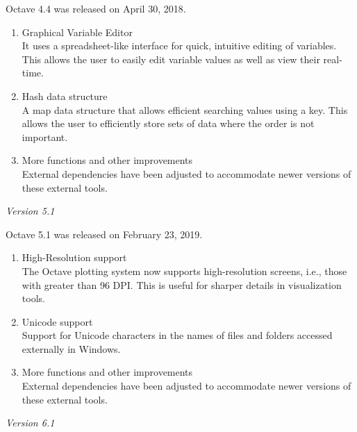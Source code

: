 \documentclass{article}
\begin{document}
\par
Octave 4.4 was released on April 30, 2018.
\begin{enumerate}

    \item Graphical Variable Editor\\
    It uses a spreadsheet-like interface for quick, intuitive editing of variables. This allows the user to easily edit variable values as well as view their real-time.

    \item Hash data structure\\
    A map data structure that allows efficient searching values using a key. This allows the user to efficiently store sets of data where the order is not important.

    \item More functions and other improvements\\
    External dependencies have been adjusted to accommodate newer versions of these external tools.

\end{enumerate}

\par
\noindent
\textit{Version 5.1}

\par
Octave 5.1 was released on February 23, 2019.
\begin{enumerate}

    \item High-Resolution support\\
    The Octave plotting system now supports high-resolution screens, i.e., those with greater than 96 DPI. This is useful for sharper details in visualization tools.

    \item Unicode support\\
    Support for Unicode characters in the names of files and folders accessed externally in Windows.

    \item More functions and other improvements\\
    External dependencies have been adjusted to accommodate newer versions of these external tools.

\end{enumerate}

\par
\noindent
\textit{Version 6.1}
\end{document}
